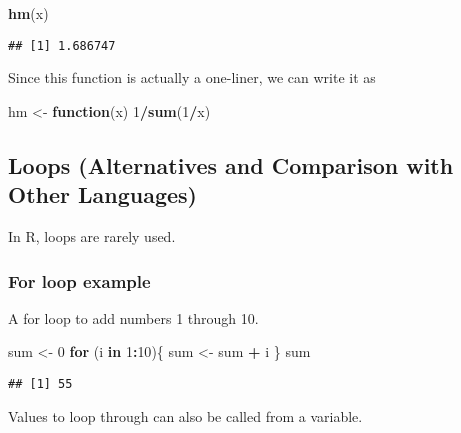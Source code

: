 \documentclass[
]{book}
\newenvironment{Shaded}{\begin{snugshade}}{\end{snugshade}}
\newcommand{\ControlFlowTok}[1]{\textcolor[rgb]{0.13,0.29,0.53}{\textbf{#1}}}
\newcommand{\DecValTok}[1]{\textcolor[rgb]{0.00,0.00,0.81}{#1}}
\newcommand{\KeywordTok}[1]{\textcolor[rgb]{0.13,0.29,0.53}{\textbf{#1}}}
\newcommand{\NormalTok}[1]{#1}
\newcommand{\OperatorTok}[1]{\textcolor[rgb]{0.81,0.36,0.00}{\textbf{#1}}}
\newcommand{\StringTok}[1]{\textcolor[rgb]{0.31,0.60,0.02}{#1}}
\begin{document}
\begin{Shaded}
\begin{Highlighting}[]
\KeywordTok{hm}\NormalTok{(x)}
\end{Highlighting}
\end{Shaded}

\begin{verbatim}
## [1] 1.686747
\end{verbatim}

Since this function is actually a one-liner, we can write it as

\begin{Shaded}
\begin{Highlighting}[]
\NormalTok{hm <-}\StringTok{ }\ControlFlowTok{function}\NormalTok{(x) }\DecValTok{1}\OperatorTok{/}\KeywordTok{sum}\NormalTok{(}\DecValTok{1}\OperatorTok{/}\NormalTok{x)}
\end{Highlighting}
\end{Shaded}

\hypertarget{loops-alternatives-and-comparison-with-other-languages}{%
\subsection{Loops (Alternatives and Comparison with Other Languages)}\label{loops-alternatives-and-comparison-with-other-languages}}

In R, loops are rarely used.

\hypertarget{for-loop-example}{%
\subsubsection{For loop example}\label{for-loop-example}}

A for loop to add numbers 1 through 10.

\begin{Shaded}
\begin{Highlighting}[]
\NormalTok{sum <-}\StringTok{ }\DecValTok{0}
\ControlFlowTok{for}\NormalTok{ (i }\ControlFlowTok{in} \DecValTok{1}\OperatorTok{:}\DecValTok{10}\NormalTok{)\{}
\NormalTok{  sum <-}\StringTok{ }\NormalTok{sum }\OperatorTok{+}\StringTok{ }\NormalTok{i}
\NormalTok{\}}
\NormalTok{sum}
\end{Highlighting}
\end{Shaded}

\begin{verbatim}
## [1] 55
\end{verbatim}

Values to loop through can also be called from a variable.
\end{document}
